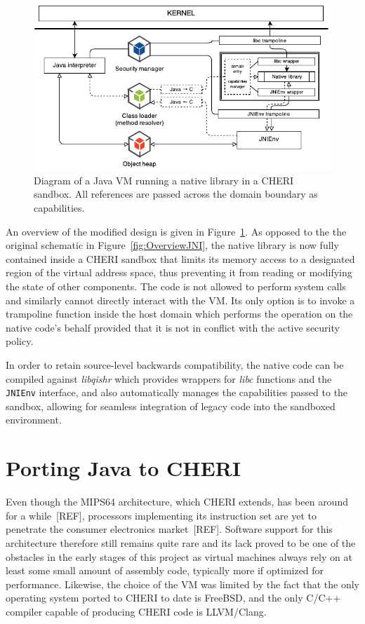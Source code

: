 \documentclass[a4paper,12pt,twoside,openright]{report}
\newcommand{\tool}[1]{\emph{#1}}
\newcommand{\lib}[1]{\tool{lib#1}}
\begin{document}
\begin{figure}
	\includegraphics[width=\textwidth]{dia_jni_caps.pdf}
	\caption{Diagram of a Java VM running a native library in a CHERI sandbox. All references are passed across the domain boundary as capabilities.}
	\label{fig:OverviewCheriJNI}
\end{figure}

An overview of the modified design is given in Figure~\ref{fig:OverviewCheriJNI}. As opposed to the the original schematic in Figure~\ref{fig:OverviewJNI}, the native library is now fully contained inside a CHERI sandbox that limits its memory access to a designated region of the virtual address space, thus preventing it from reading or modifying the state of other components. The code is not allowed to perform system calls and similarly cannot directly interact with the VM. Its only option is to invoke a trampoline function inside the host domain which performs the operation on the native code's behalf provided that it is not in conflict with the active security policy.

In order to retain source-level backwards compatibility, the native code can be compiled against \lib{qishr} which provides wrappers for \lib{c} functions and the \texttt{JNIEnv} interface, and also automatically manages the capabilities passed to the sandbox, allowing for seamless integration of legacy code into the sandboxed environment.

\section{Porting Java to CHERI}

Even though the MIPS64 architecture, which CHERI extends, has been around for a while~[REF], processors implementing its instruction set are yet to penetrate the consumer electronics market~[REF]. Software support for this architecture therefore still remains quite rare and its lack proved to be one of the obstacles in the early stages of this project as virtual machines always rely on at least some small amount of assembly code, typically more if optimized for performance. Likewise, the choice of the VM was limited by the fact that the only operating system ported to CHERI to date is FreeBSD, and the only C/C++ compiler capable of producing CHERI code is LLVM/Clang. 
\end{document}
